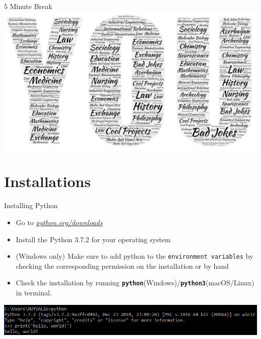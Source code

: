 		\begin{frame}{5 Minute Break}
			\centering
			\includegraphics[width=\textwidth]{images/you_wordart.PNG}
		\end{frame}

	\section{Installations}

	 	\begin{frame}{Installing Python}
			\LARGE
			\begin{itemize}
				\item Go to \href{https://www.python.org/downloads/}{\underline{\textit{python.org/downloads}}}
				\item Install the Python 3.7.2 for your operating system
				\item (Windows only) Make sure to add python to the \texttt{environment variables} by checking the corresponding permission on the installation or by hand
				\item Check the installation by running \textbf{\texttt{python}}(Windows)/\textbf{\texttt{python3}}(macOS/Linux) in terminal.
			\end{itemize}
			\includegraphics[width=\textwidth]{images/cmd_helloworld.PNG}
		\end{frame}
		 
